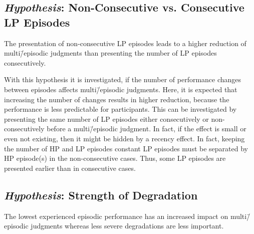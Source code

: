 \subsection[H3: Non-Consecutive vs. Consecutive \acs{LP} Episodes]{\emph{Hypothesis}: Non-Consecutive vs. Consecutive \acs{LP} Episodes}
\begin{hypothesis}\label{hypo:consecutive}
The presentation of non-consecutive \ac{LP} episodes leads to a higher reduction of multi\=/episodic judgments than presenting the number of \ac{LP} episodes consecutively.
\end{hypothesis}

With this hypothesis it is investigated, if the number of performance changes between episodes affects multi\=/episodic judgments.
Here, it is expected that increasing the number of changes results in higher reduction, because the performance is less predictable for participants.
This can be investigated by presenting the same number of \ac{LP} episodes either consecutively or non-consecutively before a multi\=/episodic judgment.
In fact, if the effect is small or even not existing, then it might be hidden by a recency effect.
In fact, keeping the number of \ac{HP} and \ac{LP} episodes constant \ac{LP} episodes must be separated by \ac{HP} episode(s) in the non-consecutive cases.
Thus, some \ac{LP} episodes are presented earlier than in consecutive cases.

\subsection[H4: Strength of Degradation]{\emph{Hypothesis}: Strength of Degradation}
\begin{hypothesis}\label{hypo:strength}
The lowest experienced episodic performance has an increased impact on multi\=/episodic judgments whereas less severe degradations are less important.
\end{hypothesis}

